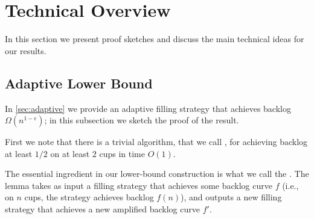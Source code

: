 \section{Technical Overview}
\label{sec:technical_overview}

In this section we present proof sketches and discuss the main technical ideas for our results. 

\subsection{Adaptive Lower Bound}\label{sec:technicaladaptive}
In \cref{sec:adaptive} we provide an adaptive filling strategy that achieves
backlog $\Omega(n^{1 - \epsilon})$; in this subsection we sketch the
proof of the result.

First we note that there is a trivial algorithm, that we call
, for achieving backlog at least $1/2$ on at
least $2$ cups in time $O(1)$.

The essential ingredient in our lower-bound construction is what we
call the . The lemma takes as input a
filling strategy that achieves some backlog curve $f$ (i.e., on $n$
cups, the strategy achieves backlog $f(n)$), and outputs a new filling
strategy that achieves a new amplified backlog curve $f'$.


